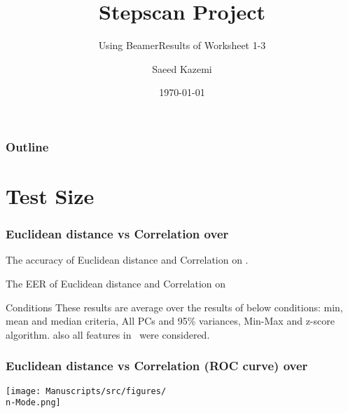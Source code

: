\documentclass{beamer}
\subtitle{Using Beamer}
\title{ \textbf{Stepscan Project}}
\subtitle{Results of Worksheet 1-3}
\date{\today}
\author{Saeed Kazemi}
\institute{ University of New Brunswick}
\begin{document}
\begin{frame}
\titlepage
\end{frame}


\begin{frame}
\frametitle{Outline}
\tableofcontents
\end{frame}



\section{Test Size}
    \begin{frame}
    \frametitle{Euclidean distance vs Correlation over \n}
    \tiny
    \begin{table}
    \centering
    \captionsetup{labelformat=empty}
    \caption{\footnotesize The accuracy of Euclidean distance and Correlation on \n.}
    
    \end{table}
    \begin{table}
    \centering
    \captionsetup{labelformat=empty}
    \caption{\footnotesize The EER of Euclidean distance and Correlation on \n}
    \label{tab:parameters condition}
    
    \end{table}
    
    \begin{block}{\footnotesize Conditions}
        \tiny These results are average over the results of below conditions: min, mean and median criteria, All PCs and 95\% variances, Min-Max and z-score algorithm. also all features in \n \ were considered.
    \end{block}
    
    \end{frame}
    
    
    
    \begin{frame}
    \centering
    \frametitle{Euclidean distance vs Correlation (ROC curve) over \n}
    \texttt{[image: Manuscripts/src/figures/\\n-Mode.png]}
    \end{frame}

    
    

\iffalse
\end{document}
